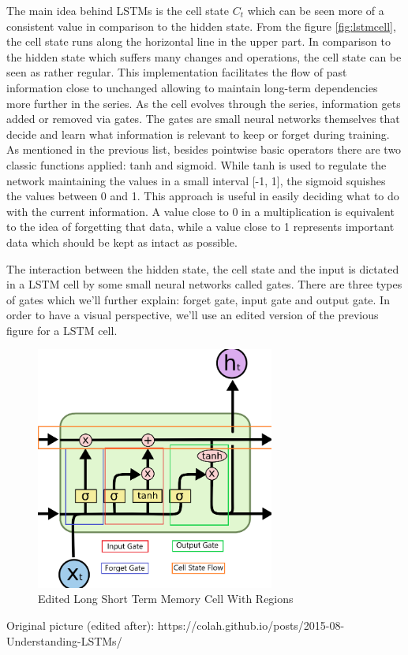 The main idea behind LSTMs is the cell state $C_t$ which can be seen more of a consistent value in comparison to the hidden state. From the figure \ref{fig:lstmcell}, the cell state runs along the horizontal line in the upper part. In comparison to the hidden state which suffers many changes and operations, the cell state can be seen as rather regular. This implementation facilitates the flow of past information close to unchanged allowing to maintain long-term dependencies more further in the series. As the cell evolves through the series, information gets added or removed via gates. The gates are small neural networks themselves that decide and learn what information is relevant to keep or forget during training. As mentioned in the previous list, besides pointwise basic operators there are two classic functions applied: tanh and sigmoid. While tanh is used to regulate the network maintaining the values in a small interval [-1, 1], the sigmoid squishes the values between 0 and 1. This approach is useful in easily deciding what to do with the current information. A value close to 0 in a multiplication is equivalent to the idea of forgetting that data, while a value close to 1 represents important data which should be kept as intact as possible.

The interaction between the hidden state, the cell state and the input is dictated in a LSTM cell by some small neural networks called gates. There are three types of gates which we'll further explain: forget gate, input gate and output gate. In order to have a visual perspective, we'll use an edited version of the previous figure for a LSTM cell.

\begin{figure}[H]
\centering
\includegraphics[height=8cm]{images/LSTMCellEdited.png} 
\caption{Edited Long Short Term Memory Cell With Regions}
\label{fig:editedlstmcell}
\end{figure}
\begin{flushright}
Original picture (edited after): https://colah.github.io/posts/2015-08-Understanding-LSTMs/
\end{flushright}

